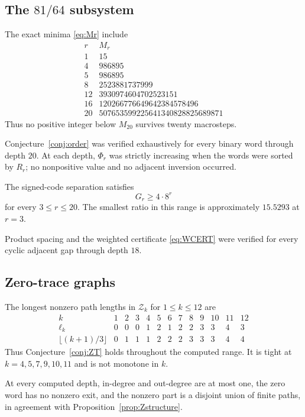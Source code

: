 \documentclass[11pt,reqno]{amsart}
\numberwithin{equation}{section}
\theoremstyle{definition}
\theoremstyle{remark}
\newcommand{\cZ}{\mathcal Z}
\begin{document}
\subsection{The $81/64$ subsystem}

The exact minima \eqref{eq:Mr} include
\[
\begin{array}{c|r}
 r&M_r\\ \hline
 1&15\\
 4&986895\\
 5&986895\\
 8&2523881737999\\
 12&3930974604702523151\\
 16&120266776649642384578496\\
 20&507653599225641340828825689871
\end{array}
\]
Thus no positive integer below $M_{20}$ survives twenty macrosteps.

Conjecture~\ref{conj:order} was verified exhaustively for every binary word through depth $20$.  At each depth, $\Phi_r$ was strictly increasing when the words were sorted by $R_r$; no nonpositive value and no adjacent inversion occurred.

The signed-code separation satisfies
\[
 G_r\ge4\cdot8^r
\]
for every $3\le r\le20$.  The smallest ratio in this range is approximately $15.5293$ at $r=3$.

Product spacing and the weighted certificate \eqref{eq:WCERT} were verified for every cyclic adjacent gap through depth $18$.

\subsection{Zero-trace graphs}

The longest nonzero path lengths in $\cZ_k$ for $1\le k\le12$ are
\[
\begin{array}{c|rrrrrrrrrrrr}
 k&1&2&3&4&5&6&7&8&9&10&11&12\\ \hline
 \ell_k&0&0&0&1&2&1&2&2&3&3&4&3\\
 \lfloor(k+1)/3\rfloor&0&1&1&1&2&2&2&3&3&3&4&4
\end{array}
\]
Thus Conjecture~\ref{conj:ZT} holds throughout the computed range.  It is tight at $k=4,5,7,9,10,11$ and is not monotone in $k$.

At every computed depth, in-degree and out-degree are at most one, the zero word has no nonzero exit, and the nonzero part is a disjoint union of finite paths, in agreement with Proposition~\ref{prop:Zstructure}.
\end{document}

